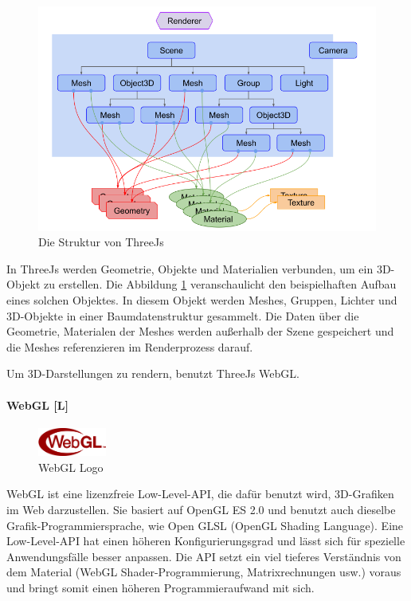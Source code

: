 \begin{figure} [h t]
  \centering
  \includegraphics[scale=0.5]{pics/threejs-structure.png}
  \caption{Die Struktur von ThreeJs \cite{ThreeJsFund}}
  \label{fig:tech:front:threejsstructure}
\end{figure}

In ThreeJs werden Geometrie, Objekte und Materialien verbunden, um ein 3D-Objekt zu erstellen. 
Die Abbildung \ref{fig:tech:front:threejsstructure} veranschaulicht den beispielhaften Aufbau eines solchen Objektes. In diesem Objekt werden Meshes, Gruppen, Lichter und 3D-Objekte in einer Baumdatenstruktur gesammelt. Die Daten über die Geometrie, Materialen der Meshes werden außerhalb der Szene gespeichert und die Meshes referenzieren im Renderprozess darauf. \cite[ThreeJs fundamentals]{ThreeJsFund}

\label{ch::ThreeJsDependency}
Um 3D-Darstellungen zu rendern, benutzt ThreeJs WebGL.

\paragraph{WebGL [L]}
\label{ch::webgl}
\begin{figure}
    \begin{center}
      \includegraphics[width=0.2\textwidth]{pics/WebGL_Logo.png}
     \caption{WebGL Logo}
    \end{center}
\end{figure}
WebGL ist eine lizenzfreie Low-Level-API, die dafür benutzt wird, 3D-Grafiken im Web darzustellen. Sie basiert auf OpenGL ES 2.0 und benutzt auch dieselbe Grafik-Programmiersprache, wie Open GLSL (OpenGL Shading Language). Eine Low-Level-API hat einen höheren Konfigurierungsgrad und lässt sich für spezielle Anwendungsfälle besser anpassen. Die API setzt ein viel tieferes Verständnis von dem Material (WebGL Shader-Programmierung, Matrixrechnungen usw.) voraus und bringt somit einen höheren Programmieraufwand mit sich. \cite{WebglGettingStarted, HighlowAPI}

